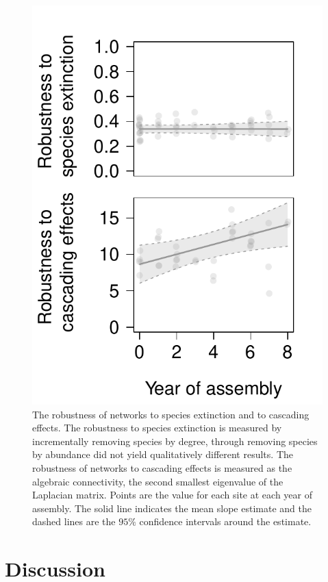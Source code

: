 \documentclass[12pt]{article}
\begin{document}
\begin{figure}
  \centering
  \includegraphics[width=.7\textwidth]{../analysis/networkLevel/figures/robustness.pdf}
  \caption{The robustness of networks to species extinction and
    to cascading effects. The robustness to species extinction is measured by
    incrementally removing species by degree, through removing species
    by abundance did not yield qualitatively different results. The robustness of networks to cascading effects is measured as the algebraic connectivity, the second smallest eigenvalue of the Laplacian matrix. Points
    are the value for each site at each year of assembly. The solid
    line indicates the mean slope estimate and the dashed lines are
    the $95\%$ confidence intervals around the estimate.}
  \label{fig:rob}
\end{figure}
\clearpage


\section*{Discussion}
\label{sec:discussion}
\end{document}
